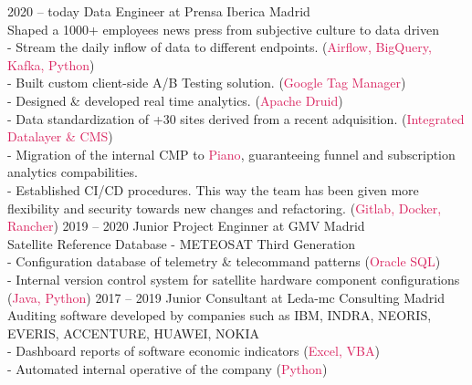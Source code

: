 \documentclass[9pt]{developercv} %
\begin{document}
\begin{entrylist}
	\entry
	{2020 -- today}
	{Data Engineer at Prensa Iberica}
	{Madrid}
	{
	\\{\large Shaped a 1000+ employees news press from subjective culture to data driven}
	\vspace{0.3cm}
	\\- Stream the daily inflow of data to different endpoints. (\textcolor[HTML]{d81e5b}{Airflow, BigQuery, Kafka, Python})
	\\- Built custom client-side A/B Testing solution. (\textcolor[HTML]{d81e5b}{Google Tag Manager})
	\\- Designed \& developed real time analytics. (\textcolor[HTML]{d81e5b}{Apache Druid})
	\\- Data standardization of +30 sites derived from a recent adquisition. (\textcolor[HTML]{d81e5b}{Integrated Datalayer \& CMS})
	\\- Migration of the internal CMP to \textcolor[HTML]{d81e5b}{Piano}, guaranteeing funnel and subscription analytics compabilities.
	\\- Established CI/CD procedures. This way the team has been given more flexibility and security towards new changes and refactoring. (\textcolor[HTML]{d81e5b}{Gitlab, Docker, Rancher})
	}
	\entry
	{2019 -- 2020}
	{Junior Project Enginner at GMV}
	{Madrid}
	{
	\\{\large Satellite Reference Database - METEOSAT Third Generation}
	\vspace{0.3cm}
	\\- Configuration database of telemetry \& telecommand patterns (\textcolor[HTML]{d81e5b}{Oracle SQL})
	\\- Internal version control system for satellite hardware component configurations (\textcolor[HTML]{d81e5b}{Java, Python})
	}
	\entry
	{2017 -- 2019}
	{Junior Consultant at Leda-mc Consulting}
	{Madrid}
	{
	\\{\large Auditing software developed by companies such as IBM, INDRA, NEORIS, EVERIS, ACCENTURE, HUAWEI, NOKIA}
	\vspace{0.3cm}
	\\- Dashboard reports of software economic indicators (\textcolor[HTML]{d81e5b}{Excel, VBA})
	\\- Automated internal operative of the company (\textcolor[HTML]{d81e5b}{Python})
	}

\end{entrylist}

\vspace{0.3cm}
\end{document}
